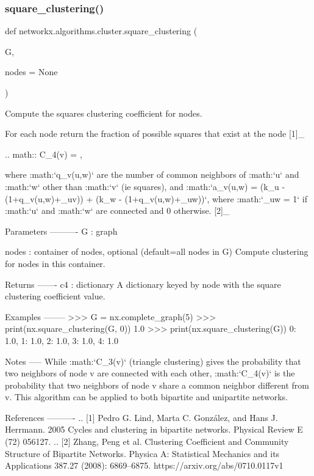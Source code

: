 \subsubsection{\texorpdfstring{square\+\_\+clustering()}{square\_clustering()}}
{\footnotesize\ttfamily def networkx.\+algorithms.\+cluster.\+square\+\_\+clustering (\begin{DoxyParamCaption}\item[{}]{G,  }\item[{}]{nodes = {\ttfamily None} }\end{DoxyParamCaption})}

\begin{DoxyVerb}Compute the squares clustering coefficient for nodes.

For each node return the fraction of possible squares that exist at
the node [1]_

.. math::
   C_4(v) = ,

where :math:`q_v(u,w)` are the number of common neighbors of :math:`u` and
:math:`w` other than :math:`v` (ie squares), and :math:`a_v(u,w) = (k_u -
(1+q_v(u,w)+\theta_{uv})) + (k_w - (1+q_v(u,w)+\theta_{uw}))`, where
:math:`\theta_{uw} = 1` if :math:`u` and :math:`w` are connected and 0
otherwise. [2]_

Parameters
----------
G : graph

nodes : container of nodes, optional (default=all nodes in G)
   Compute clustering for nodes in this container.

Returns
-------
c4 : dictionary
   A dictionary keyed by node with the square clustering coefficient value.

Examples
--------
>>> G = nx.complete_graph(5)
>>> print(nx.square_clustering(G, 0))
1.0
>>> print(nx.square_clustering(G))
{0: 1.0, 1: 1.0, 2: 1.0, 3: 1.0, 4: 1.0}

Notes
-----
While :math:`C_3(v)` (triangle clustering) gives the probability that
two neighbors of node v are connected with each other, :math:`C_4(v)` is
the probability that two neighbors of node v share a common
neighbor different from v. This algorithm can be applied to both
bipartite and unipartite networks.

References
----------
.. [1] Pedro G. Lind, Marta C. González, and Hans J. Herrmann. 2005
    Cycles and clustering in bipartite networks.
    Physical Review E (72) 056127.
.. [2] Zhang, Peng et al. Clustering Coefficient and Community Structure of
    Bipartite Networks. Physica A: Statistical Mechanics and its Applications 387.27 (2008): 6869–6875.
    https://arxiv.org/abs/0710.0117v1
\end{DoxyVerb}
 \mbox{\label{namespacenetworkx_1_1algorithms_1_1cluster_a364c2a90c8b1ce724099dfdd8bf20c66}} 
